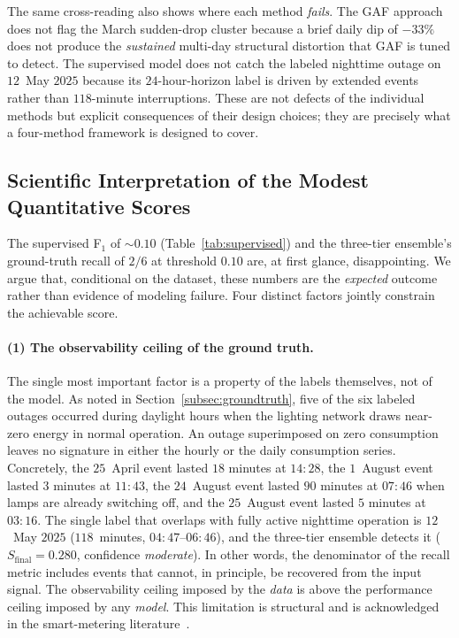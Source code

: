 \documentclass{article}
\begin{document}
The same cross-reading also shows where each method \emph{fails}. The GAF approach does not flag the March sudden-drop cluster because a brief daily dip of $-33\%$ does not produce the \emph{sustained} multi-day structural distortion that GAF is tuned to detect. The supervised model does not catch the labeled nighttime outage on $12$~May $2025$ because its $24$-hour-horizon label is driven by extended events rather than $118$-minute interruptions. These are not defects of the individual methods but explicit consequences of their design choices; they are precisely what a four-method framework is designed to cover.

\subsection{Scientific Interpretation of the Modest Quantitative Scores}
\label{subsec:low_scores}

The supervised F$_1$ of $\sim 0.10$ (Table~\ref{tab:supervised}) and the three-tier ensemble's ground-truth recall of $2/6$ at threshold $0.10$ are, at first glance, disappointing. We argue that, conditional on the dataset, these numbers are the \emph{expected} outcome rather than evidence of modeling failure. Four distinct factors jointly constrain the achievable score.

\paragraph{(1) The observability ceiling of the ground truth.}
The single most important factor is a property of the labels themselves, not of the model. As noted in Section~\ref{subsec:groundtruth}, five of the six labeled outages occurred during daylight hours when the lighting network draws near-zero energy in normal operation. An outage superimposed on zero consumption leaves no signature in either the hourly or the daily consumption series. Concretely, the $25$~April event lasted $18$ minutes at $14{:}28$, the $1$~August event lasted $3$ minutes at $11{:}43$, the $24$~August event lasted $90$ minutes at $07{:}46$ when lamps are already switching off, and the $25$~August event lasted $5$ minutes at $03{:}16$. The single label that overlaps with fully active nighttime operation is $12$~May $2025$ ($118$~minutes, $04{:}47$--$06{:}46$), and the three-tier ensemble detects it ($S_{\text{final}}=0.280$, confidence \emph{moderate}). In other words, the denominator of the recall metric includes events that cannot, in principle, be recovered from the input signal. The observability ceiling imposed by the \emph{data} is above the performance ceiling imposed by any \emph{model}. This limitation is structural and is acknowledged in the smart-metering literature~\cite{himeur2021survey}.
\end{document}
